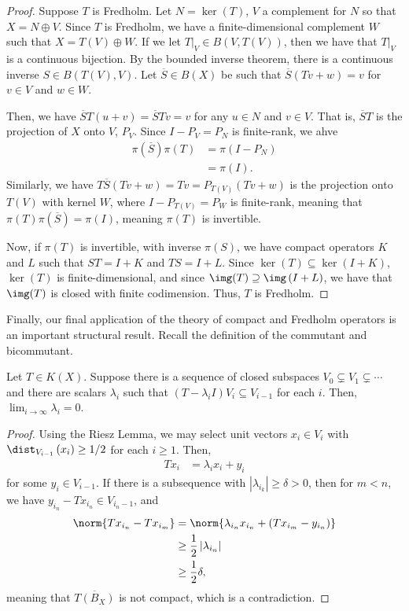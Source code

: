 \documentclass[10pt]{mypackage}
\begin{document}
\begin{proof}
  Suppose $T$ is Fredholm. Let $N = \ker(T)$, $V$ a complement for $N$ so that $X = N\oplus V$. Since $T$ is Fredholm, we have a finite-dimensional complement $W$ such that $X = T(V) \oplus W$. If we let $T|_{V}\in B(V,T(V))$, then we have that $T|_{V}$ is a continuous bijection. By the bounded inverse theorem, there is a continuous inverse $S\in B(T(V),V)$. Let $ \overline{S}\in B(X) $ be such that $ \overline{S}(Tv + w) = v $ for $v\in V$ and $w\in W$.

  Then, we have $ \overline{S}T(u + v) = \overline{S}Tv = v $ for any $u\in N$ and $v\in V$. That is, $ \overline{S}T$ is the projection of $X$ onto $V$, $P_V$. Since $I - P_V = P_N$ is finite-rank, we ahve
  \begin{align*}
    \pi( \overline{S} )\pi(T) &= \pi\left( I-P_N \right)\\
                              &= \pi(I).
  \end{align*}
  Similarly, we have $T \overline{S}\left( Tv + w \right) = Tv = P_{T(V)}(Tv + w)$ is the projection onto $T(V)$ with kernel $W$, where $I-P_{T(V)} = P_W$ is finite-rank, meaning that $ \pi(T) \pi( \overline{S} ) = \pi(I)$, meaning $\pi(T)$ is invertible.

  Now, if $\pi(T)$ is invertible, with inverse $\pi(S)$, we have compact operators $K$ and $L$ such that $ST = I + K$ and $TS = I + L$. Since $\ker(T) \subseteq \ker\left( I+K \right)$, $\ker(T)$ is finite-dimensional, and since $\img(T) \supseteq \img\left(I + L\right)$, we have that $\img(T)$ is closed with finite codimension. Thus, $T$ is Fredholm.
\end{proof}
Finally, our final application of the theory of compact and Fredholm operators is an important structural result. Recall the definition of the commutant and bicommutant.
\begin{lemma}
  Let $T\in K(X)$. Suppose there is a sequence of closed subspaces $V_0\subsetneq V_1\subsetneq \cdots$ and there are scalars $\lambda_i$ such that $\left( T-\lambda_i I \right)V_i\subseteq V_{i-1}$ for each $i$. Then, $\lim_{i\rightarrow\infty}\lambda_i = 0$.
\end{lemma}
\begin{proof}
  Using the Riesz Lemma, we may select unit vectors $x_i\in V_i$ with $\dist_{V_{i-1}}\left(x_i\right)\geq 1/2$ for each $i\geq 1$. Then,
  \begin{align*}
    Tx_i &= \lambda_i x_i + y_i
  \end{align*}
  for some $y_i\in V_{i-1}$. If there is a subsequence with $\left\vert \lambda_{i_k} \right\vert \geq \delta > 0$, then for $m < n$, we have $y_{i_n}-Tx_{i_n} \in V_{i_n-1}$, and
  \begin{align*}
    \norm{Tx_{i_n} - Tx_{i_m}} &= \norm{\lambda_{i_n}x_{i_n} + \left( Tx_{i_m} - y_{i_n} \right)}\\
                               &\geq \frac{1}{2}\left\vert \lambda_{i_n} \right\vert\\
                               &\geq \frac{1}{2}\delta,
  \end{align*}
  meaning that $ \overline{T\left( B_X \right)} $ is not compact, which is a contradiction.
\end{proof}
\end{document}
